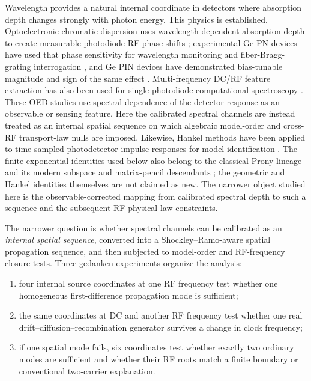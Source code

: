 \documentclass[11pt]{article}
\begin{document}
Wavelength provides a natural internal coordinate in detectors where absorption depth changes strongly with photon energy. This physics is established. Optoelectronic chromatic dispersion uses wavelength-dependent absorption depth to create measurable photodiode RF phase shifts \cite{Glasser2021}; experimental Ge PN devices have used that phase sensitivity for wavelength monitoring and fiber-Bragg-grating interrogation \cite{Liokumovitch2021}, and Ge PIN devices have demonstrated bias-tunable magnitude and sign of the same effect \cite{Dutta2024}. Multi-frequency DC/RF feature extraction has also been used for single-photodiode computational spectroscopy \cite{Kassa2026}. These OED studies use spectral dependence of the detector response as an observable or sensing feature. Here the calibrated spectral channels are instead treated as an internal spatial sequence on which algebraic model-order and cross-RF transport-law nulls are imposed. Likewise, Hankel methods have been applied to time-sampled photodetector impulse responses for model identification \cite{Sun2025}. The finite-exponential identities used below also belong to the classical Prony lineage and its modern subspace and matrix-pencil descendants \cite{Prony1795,RoyKailath1989,HuaSarkar1990}; the geometric and Hankel identities themselves are not claimed as new. The narrower object studied here is the observable-corrected mapping from calibrated spectral depth to such a sequence and the subsequent RF physical-law constraints.

The narrower question is whether spectral channels can be calibrated as an \emph{internal spatial sequence}, converted into a Shockley--Ramo-aware spatial propagation sequence, and then subjected to model-order and RF-frequency closure tests. Three gedanken experiments organize the analysis:
\begin{enumerate}[label=(\roman*)]
    \item four internal source coordinates at one RF frequency test whether one homogeneous first-difference propagation mode is sufficient;
    \item the same coordinates at DC and another RF frequency test whether one real drift--diffusion--recombination generator survives a change in clock frequency;
    \item if one spatial mode fails, six coordinates test whether exactly two ordinary modes are sufficient and whether their RF roots match a finite boundary or conventional two-carrier explanation.
\end{enumerate}
\end{document}

